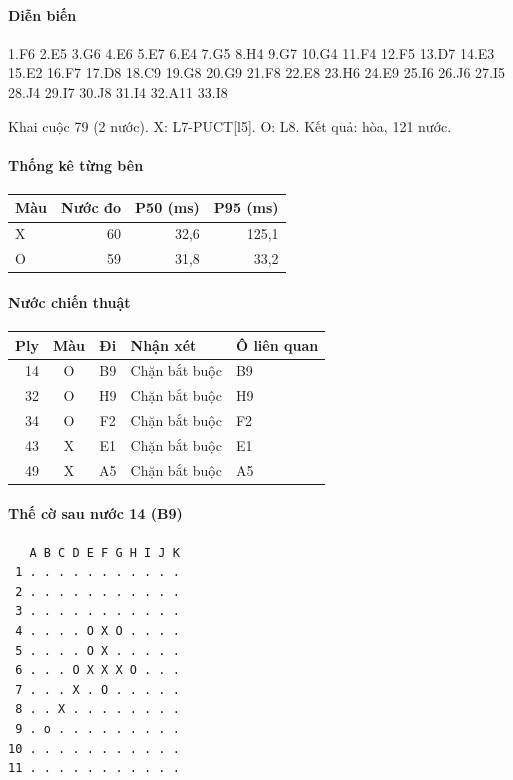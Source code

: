 \paragraph{Diễn biến}
{\footnotesize 1.F6 2.E5 3.G6 4.E6 5.E7 6.E4 7.G5 8.H4 9.G7 10.G4 11.F4 12.F5 13.D7 14.E3 15.E2 16.F7 17.D8 18.C9 19.G8 20.G9 21.F8 22.E8 23.H6 24.E9 25.I6 26.J6 27.I5 28.J4 29.I7 30.J8 31.I4 32.A11 33.I8\par}
Khai cuộc 79 (2 nước). X: L7-PUCT[l5]. O: L8. Kết quả: hòa, 121 nước.
\paragraph{Thống kê từng bên}
\begin{center}\small
\begin{tabular}{@{}lrrr@{}}
\toprule
Màu & Nước đo & P50 (ms) & P95 (ms) \\
\midrule
X & 60 & 32,6 & 125,1 \\
O & 59 & 31,8 & 33,2 \\
\bottomrule
\end{tabular}
\end{center}
\paragraph{Nước chiến thuật}
\begin{center}\small
\begin{tabular}{@{}rccll@{}}
\toprule
Ply & Màu & Đi & Nhận xét & Ô liên quan \\
\midrule
14 & O & B9 & Chặn bắt buộc & B9 \\
32 & O & H9 & Chặn bắt buộc & H9 \\
34 & O & F2 & Chặn bắt buộc & F2 \\
43 & X & E1 & Chặn bắt buộc & E1 \\
49 & X & A5 & Chặn bắt buộc & A5 \\
\bottomrule
\end{tabular}
\end{center}
\paragraph{Thế cờ sau nước 14 (B9)}
\begin{verbatim}
   A B C D E F G H I J K
 1 . . . . . . . . . . .
 2 . . . . . . . . . . .
 3 . . . . . . . . . . .
 4 . . . . O X O . . . .
 5 . . . . O X . . . . .
 6 . . . O X X X O . . .
 7 . . . X . O . . . . .
 8 . . X . . . . . . . .
 9 . o . . . . . . . . .
10 . . . . . . . . . . .
11 . . . . . . . . . . .
\end{verbatim}
